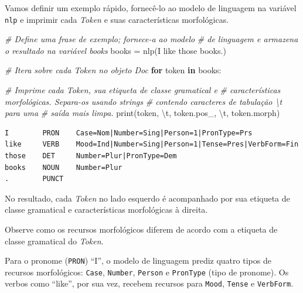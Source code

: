 \documentclass[
  brazilian,
]{article}
\newenvironment{Shaded}{}{}
\newcommand{\BuiltInTok}[1]{#1}
\newcommand{\CharTok}[1]{\textcolor[rgb]{0.25,0.44,0.63}{#1}}
\newcommand{\CommentTok}[1]{\textcolor[rgb]{0.38,0.63,0.69}{\textit{#1}}}
\newcommand{\ControlFlowTok}[1]{\textcolor[rgb]{0.00,0.44,0.13}{\textbf{#1}}}
\newcommand{\KeywordTok}[1]{\textcolor[rgb]{0.00,0.44,0.13}{\textbf{#1}}}
\newcommand{\NormalTok}[1]{#1}
\newcommand{\OperatorTok}[1]{\textcolor[rgb]{0.40,0.40,0.40}{#1}}
\newcommand{\StringTok}[1]{\textcolor[rgb]{0.25,0.44,0.63}{#1}}
\begin{document}
Vamos definir um exemplo rápido, fornecê-lo ao modelo de linguagem na
variável \texttt{nlp} e imprimir cada \emph{Token} e suas
características morfológicas.

\begin{Shaded}
\begin{Highlighting}[]
\CommentTok{\# Define uma frase de exemplo; fornece{-}a ao modelo}
\CommentTok{\# de linguagem e armazena o resultado na variável \textquotesingle{}books\textquotesingle{}}
\NormalTok{books }\OperatorTok{=}\NormalTok{ nlp(}\StringTok{\textquotesingle{}I like those books.\textquotesingle{}}\NormalTok{)}

\CommentTok{\# Itera sobre cada Token no objeto Doc}
\ControlFlowTok{for}\NormalTok{ token }\KeywordTok{in}\NormalTok{ books:}
    
    \CommentTok{\# Imprime cada Token, sua etiqueta de classe gramatical e}
    \CommentTok{\# características morfológicas. Separa{-}os usando strings}
    \CommentTok{\# contendo caracteres de tabulação \textquotesingle{}\textbackslash{}t\textquotesingle{} para uma}
    \CommentTok{\# saída mais limpa.}
    \BuiltInTok{print}\NormalTok{(token, }\StringTok{\textquotesingle{}}\CharTok{\textbackslash{}t}\StringTok{\textquotesingle{}}\NormalTok{, token.pos\_, }\StringTok{\textquotesingle{}}\CharTok{\textbackslash{}t}\StringTok{\textquotesingle{}}\NormalTok{, token.morph)}
\end{Highlighting}
\end{Shaded}

\begin{verbatim}
I        PRON    Case=Nom|Number=Sing|Person=1|PronType=Prs
like     VERB    Mood=Ind|Number=Sing|Person=1|Tense=Pres|VerbForm=Fin
those    DET     Number=Plur|PronType=Dem
books    NOUN    Number=Plur
.        PUNCT   
\end{verbatim}

No resultado, cada \emph{Token} no lado esquerdo é acompanhado por sua
etiqueta de classe gramatical e características morfológicas à direita.

Observe como os recursos morfológicos diferem de acordo com a etiqueta
de classe gramatical do \emph{Token}.

Para o pronome (\texttt{PRON}) ``I'', o modelo de linguagem prediz
quatro tipos de recursos morfológicos: \texttt{Case}, \texttt{Number},
\texttt{Person} e \texttt{PronType} (tipo de pronome). Os verbos como
``like'', por sua vez, recebem recursos para \texttt{Mood},
\texttt{Tense} e \texttt{VerbForm}.
\end{document}
